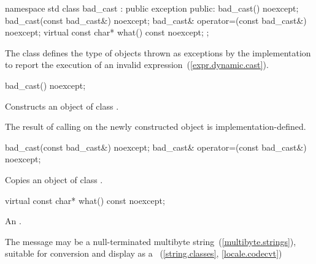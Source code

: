 %
\begin{codeblock}
namespace std {
  class bad_cast : public exception {
  public:
    bad_cast() noexcept;
    bad_cast(const bad_cast&) noexcept;
    bad_cast& operator=(const bad_cast&) noexcept;
    virtual const char* what() const noexcept;
  };
}
\end{codeblock}

\pnum
The class
defines the type of objects thrown
as exceptions by the implementation to report the execution of an invalid
expression~(\ref{expr.dynamic.cast}).

%
%
\begin{itemdecl}
bad_cast() noexcept;
\end{itemdecl}

\begin{itemdescr}
\pnum
\effects
Constructs an object of class
.

\pnum
\notes
The result of calling
on the newly constructed object is implementation-defined.%
\end{itemdescr}

%
%
\begin{itemdecl}
    bad_cast(const bad_cast&) noexcept;
    bad_cast& operator=(const bad_cast&) noexcept;
\end{itemdecl}

\begin{itemdescr}
\pnum
\effects
Copies an object of class
.
\end{itemdescr}

%
\begin{itemdecl}
virtual const char* what() const noexcept;
\end{itemdecl}

\begin{itemdescr}
\pnum
\returns
An  \ntbs.%

\pnum
\notes
The message may be a null-terminated multibyte string~(\ref{multibyte.strings}),
suitable for conversion and display as a
~(\ref{string.classes}, \ref{locale.codecvt})
\end{itemdescr}

